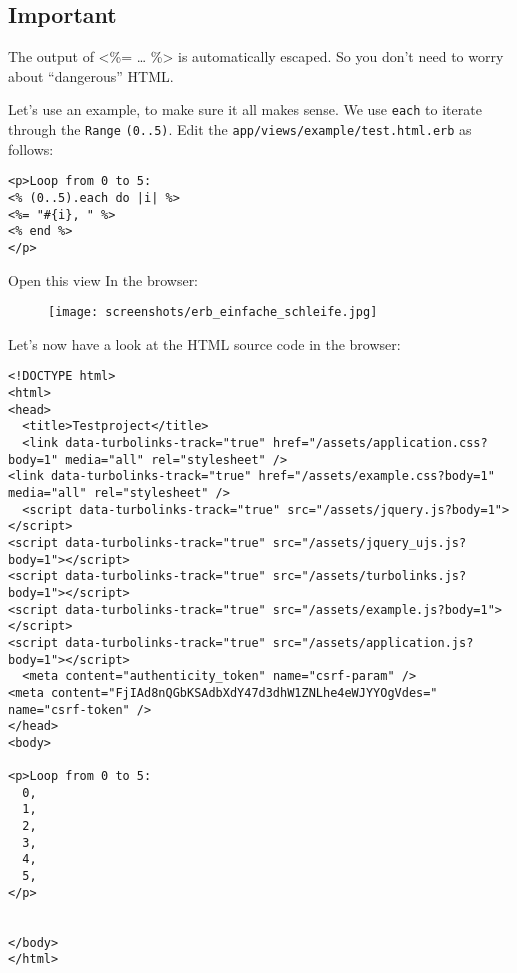 \documentclass[a4paper]{book}
\begin{document}
\subsection{Important}\label{important-6}

The output of \textless{}\%= \ldots{} \%\textgreater{} is automatically escaped. So you don't need to worry about “dangerous” HTML.

Let's use an example, to make sure it all makes sense. We use \texttt{each} to iterate through the \texttt{Range} \texttt{(0..5)}. Edit the \texttt{app/views/example/test.html.erb} as follows:

\begin{shaded}\begin{verbatim}
<p>Loop from 0 to 5:
<% (0..5).each do |i| %>
<%= "#{i}, " %>
<% end %>
</p>
\end{verbatim}\end{shaded}

Open this view In the browser:

\begin{figure}[htbp]
\centering
\texttt{[image: screenshots/erb\_einfache\_schleife.jpg]}
\end{figure}

Let's now have a look at the HTML source code in the browser:

\begin{shaded}\begin{verbatim}
<!DOCTYPE html>
<html>
<head>
  <title>Testproject</title>
  <link data-turbolinks-track="true" href="/assets/application.css?body=1" media="all" rel="stylesheet" />
<link data-turbolinks-track="true" href="/assets/example.css?body=1" media="all" rel="stylesheet" />
  <script data-turbolinks-track="true" src="/assets/jquery.js?body=1"></script>
<script data-turbolinks-track="true" src="/assets/jquery_ujs.js?body=1"></script>
<script data-turbolinks-track="true" src="/assets/turbolinks.js?body=1"></script>
<script data-turbolinks-track="true" src="/assets/example.js?body=1"></script>
<script data-turbolinks-track="true" src="/assets/application.js?body=1"></script>
  <meta content="authenticity_token" name="csrf-param" />
<meta content="FjIAd8nQGbKSAdbXdY47d3dhW1ZNLhe4eWJYYOgVdes=" name="csrf-token" />
</head>
<body>

<p>Loop from 0 to 5:
  0,
  1,
  2,
  3,
  4,
  5,
</p>


</body>
</html>
\end{verbatim}\end{shaded}
\end{document}
